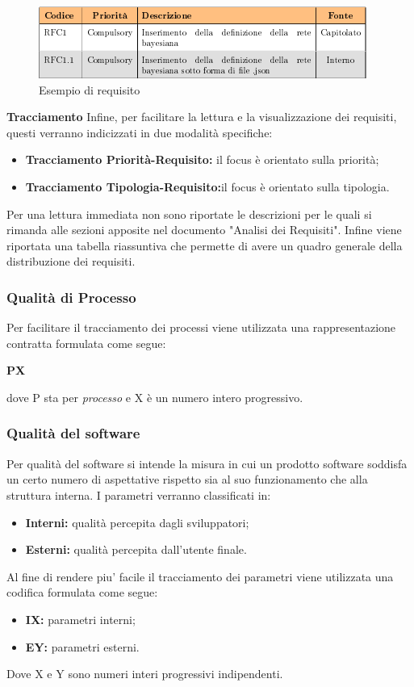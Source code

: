 	    \begin{figure}[!htbp]
	    	\centering
	    	\includegraphics{requisiti.png}
	    	\caption{Esempio di requisito}
	    \end{figure}
	    
	    \textbf{Tracciamento} Infine, per facilitare la lettura e la visualizzazione dei requisiti, questi verranno indicizzati in due modalità specifiche:
	    \begin{itemize}
	    	\item \textbf{Tracciamento Priorità-Requisito:} il focus è orientato sulla priorità;
	    	\item \textbf{Tracciamento Tipologia-Requisito:}il focus è orientato sulla tipologia.\newline
	    \end{itemize}
	    Per una lettura immediata non sono riportate le descrizioni per le quali si rimanda alle sezioni apposite nel documento "Analisi dei Requisiti".
	    Infine viene riportata una tabella riassuntiva che permette di avere un quadro generale della distribuzione dei requisiti.\newline
\subsubsection{Qualità di Processo}
	    Per facilitare il tracciamento dei processi viene utilizzata una rappresentazione contratta formulata come segue:
	    \begin{center}
	    	\textbf{PX}
	    \end{center}
	    dove P sta per \textit{processo} e X è un numero intero progressivo.
\subsubsection{Qualità del software}
Per qualità del software si intende la misura in cui un prodotto software soddisfa un certo numero di aspettative rispetto sia al suo funzionamento che alla struttura interna. I parametri verranno classificati in:
\begin{itemize}
    \item{\textbf{Interni:} qualità percepita dagli sviluppatori;}
    \item{\textbf{Esterni:} qualità percepita dall'utente finale.}
\end{itemize}
Al fine di rendere piu' facile il tracciamento dei parametri viene utilizzata una codifica formulata come segue:
\begin{itemize}
    \item{\textbf{IX:} parametri interni;}
    \item{\textbf{EY:} parametri esterni.}
\end{itemize}
Dove X e Y sono numeri interi progressivi indipendenti.
